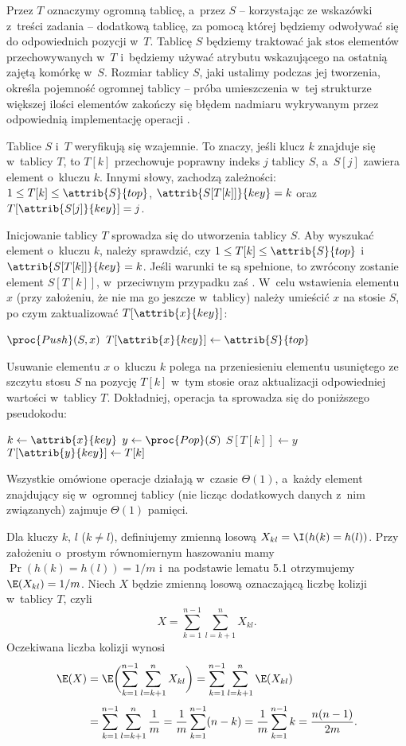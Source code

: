 \noindent Przez $T$ oznaczymy ogromną tablicę, a~przez $S$ -- korzystając ze wskazówki z~treści zadania -- dodatkową tablicę, za pomocą której będziemy odwoływać się do odpowiednich pozycji w~$T$.
Tablicę $S$ będziemy traktować jak stos elementów przechowywanych w~$T$ i~będziemy używać atrybutu  wskazującego na ostatnią zajętą komórkę w~$S$.
Rozmiar tablicy $S$, jaki ustalimy podczas jej tworzenia, określa pojemność ogromnej tablicy -- próba umieszczenia w~tej strukturze większej ilości elementów zakończy się błędem nadmiaru wykrywanym przez odpowiednią implementację operacji .

Tablice $S$ i~$T$ weryfikują się wzajemnie.
To znaczy, jeśli klucz $k$ znajduje się w~tablicy $T$, to $T[k]$ przechowuje poprawny indeks $j$ tablicy $S$, a~$S[j]$ zawiera element o~kluczu $k$.
Innymi słowy, zachodzą zależności: $1\le T[k]\le\attrib{S}{top}$, $\attrib{S[T[k]]}{key}=k$ oraz $T[\attrib{S[j]}{key}]=j$.

Inicjowanie tablicy $T$ sprowadza się do utworzenia tablicy $S$.
Aby wyszukać element o~kluczu $k$, należy sprawdzić, czy $1\le T[k]\le\attrib{S}{top}$ i~$\attrib{S[T[k]]}{key}=k$.
Jeśli warunki te są spełnione, to zwrócony zostanie element $S[T[k]]$, w~przeciwnym przypadku zaś .
W~celu wstawienia elementu $x$ (przy założeniu, że nie ma go jeszcze w~tablicy) należy umieścić $x$ na stosie $S$, po czym zaktualizować $T[\attrib{x}{key}]$:
\begin{codebox}
\li	$\proc{Push}(S,x)$
\li	$T[\attrib{x}{key}]\gets\attrib{S}{top}$
\end{codebox}
Usuwanie elementu $x$ o~kluczu $k$ polega na przeniesieniu elementu usuniętego ze szczytu stosu $S$ na pozycję $T[k]$ w~tym stosie oraz aktualizacji odpowiedniej wartości w~tablicy $T$.
Dokładniej, operacja ta sprowadza się do poniższego pseudokodu:
\begin{codebox}
\li	$k\gets\attrib{x}{key}$
\li	$y\gets\proc{Pop}(S)$
\li	$S[T[k]]\gets y$
\li	$T[\attrib{y}{key}]\gets T[k]$
\end{codebox}

Wszystkie omówione operacje działają w~czasie $\Theta(1)$, a~każdy element znajdujący się w~ogromnej tablicy (nie licząc dodatkowych danych z~nim związanych) zajmuje $\Theta(1)$ pamięci.


\exercise %
Dla kluczy $k$, $l$ ($k\ne l$), definiujemy zmienną losową $X_{kl}=\I(h(k)=h(l))$.
Przy założeniu o~prostym równomiernym haszowaniu mamy $\Pr(h(k)=h(l))=1/m$ i~na podstawie lematu 5.1 otrzymujemy $\E(X_{kl})=1/m$.
Niech $X$ będzie zmienną losową oznaczającą liczbę kolizji w~tablicy $T$, czyli
\[
    X = \sum_{k=1}^{n-1}\sum_{l=k+1}^nX_{kl}.
\]
Oczekiwana liczba kolizji wynosi
\begin{align*}
	\E(X) &= \E\biggl(\sum_{k=1}^{n-1}\sum_{l=k+1}^nX_{kl}\biggr) = \sum_{k=1}^{n-1}\sum_{l=k+1}^n\E(X_{kl}) \\[1mm]
	&= \sum_{k=1}^{n-1}\sum_{l=k+1}^n\frac{1}{m} = \frac{1}{m}\sum_{k=1}^{n-1}(n-k) = \frac{1}{m}\sum_{k=1}^{n-1}k = \frac{n(n-1)}{2m}.
\end{align*}

